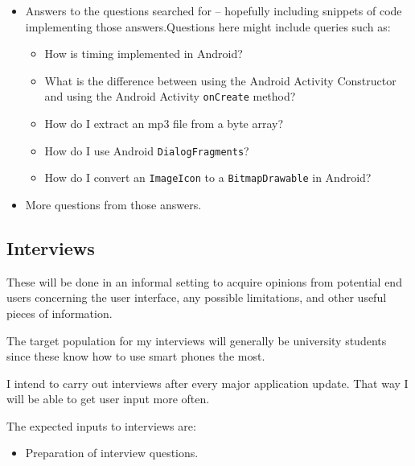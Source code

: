 \documentclass[12pt,svgnames,smaller]{article} %
\begin{document}
		\begin{itemize}
			\item Answers to the questions searched for – hopefully including snippets of code implementing those answers.Questions here might include queries such as:
			
			\begin{itemize}
				\item How is timing implemented in Android?
				\item What is the difference between using the Android Activity Constructor and using the Android Activity \texttt{onCreate} method?
				\item How do I extract an mp3 file from a byte array?
				\item How do I use Android \texttt{DialogFragments}?
				\item How do I convert an \texttt{ImageIcon} to a \texttt{BitmapDrawable} in Android?
			\end{itemize} 
			
			\item More questions from those answers.
		\end{itemize}
		
		
		\subsection{Interviews}
				
		These will be done in an informal setting to acquire opinions from potential end users concerning the user interface, any possible limitations, and other useful pieces of information.
		
		The target population for my interviews will generally be university students since these know how to use smart phones the most.
		
		I intend to carry out interviews after every major application update. That way I will be able to get user input more often.
		
		The expected inputs to interviews are: 
		
		\begin{itemize}
			\item Preparation of interview questions.
		\end{itemize}
		
\end{document}
